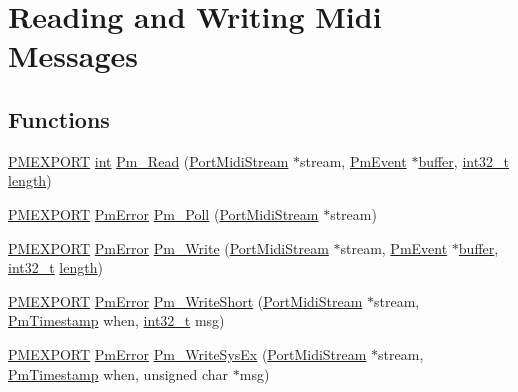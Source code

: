 \hypertarget{group__grp__io}{}\section{Reading and Writing Midi Messages}
\label{group__grp__io}
\subsection*{Functions}
\begin{DoxyCompactItemize}
\item 
\hyperlink{porttime_8h_ad478fb637833fb6b1a4bdb25a03f4662}{P\+M\+E\+X\+P\+O\+RT} \hyperlink{xmltok_8h_a5a0d4a5641ce434f1d23533f2b2e6653}{int} \hyperlink{group__grp__io_ga3d59225bc890ede974f245ada3de6456}{Pm\+\_\+\+Read} (\hyperlink{portmidi_8h_af4949219ee1bb0afc857cb242d123914}{Port\+Midi\+Stream} $\ast$stream, \hyperlink{struct_pm_event}{Pm\+Event} $\ast$\hyperlink{structbuffer}{buffer}, \hyperlink{lib-src_2ffmpeg_2win32_2stdint_8h_a37994e3b11c72957c6f454c6ec96d43d}{int32\+\_\+t} \hyperlink{test__lib_f_l_a_c_2format_8c_ac94dc16b22556ba5fa815655f27442da}{length})
\item 
\hyperlink{porttime_8h_ad478fb637833fb6b1a4bdb25a03f4662}{P\+M\+E\+X\+P\+O\+RT} \hyperlink{portmidi_8h_a5fd46ccd2e320e17a840886731e8c6b9}{Pm\+Error} \hyperlink{group__grp__io_ga54198ca9dc1af9d82ec5f44f661faeea}{Pm\+\_\+\+Poll} (\hyperlink{portmidi_8h_af4949219ee1bb0afc857cb242d123914}{Port\+Midi\+Stream} $\ast$stream)
\item 
\hyperlink{porttime_8h_ad478fb637833fb6b1a4bdb25a03f4662}{P\+M\+E\+X\+P\+O\+RT} \hyperlink{portmidi_8h_a5fd46ccd2e320e17a840886731e8c6b9}{Pm\+Error} \hyperlink{group__grp__io_ga82950117f003d28f9ca6536c00af985a}{Pm\+\_\+\+Write} (\hyperlink{portmidi_8h_af4949219ee1bb0afc857cb242d123914}{Port\+Midi\+Stream} $\ast$stream, \hyperlink{struct_pm_event}{Pm\+Event} $\ast$\hyperlink{structbuffer}{buffer}, \hyperlink{lib-src_2ffmpeg_2win32_2stdint_8h_a37994e3b11c72957c6f454c6ec96d43d}{int32\+\_\+t} \hyperlink{test__lib_f_l_a_c_2format_8c_ac94dc16b22556ba5fa815655f27442da}{length})
\item 
\hyperlink{porttime_8h_ad478fb637833fb6b1a4bdb25a03f4662}{P\+M\+E\+X\+P\+O\+RT} \hyperlink{portmidi_8h_a5fd46ccd2e320e17a840886731e8c6b9}{Pm\+Error} \hyperlink{group__grp__io_ga4a8cdd77e5b2ad4c16338eed475dfc6b}{Pm\+\_\+\+Write\+Short} (\hyperlink{portmidi_8h_af4949219ee1bb0afc857cb242d123914}{Port\+Midi\+Stream} $\ast$stream, \hyperlink{portmidi_8h_acf4245beeef251c4a46d66e99d77ffdf}{Pm\+Timestamp} when, \hyperlink{lib-src_2ffmpeg_2win32_2stdint_8h_a37994e3b11c72957c6f454c6ec96d43d}{int32\+\_\+t} msg)
\item 
\hyperlink{porttime_8h_ad478fb637833fb6b1a4bdb25a03f4662}{P\+M\+E\+X\+P\+O\+RT} \hyperlink{portmidi_8h_a5fd46ccd2e320e17a840886731e8c6b9}{Pm\+Error} \hyperlink{group__grp__io_ga4bd5753bdfb53a1611bcdf5ba159fc87}{Pm\+\_\+\+Write\+Sys\+Ex} (\hyperlink{portmidi_8h_af4949219ee1bb0afc857cb242d123914}{Port\+Midi\+Stream} $\ast$stream, \hyperlink{portmidi_8h_acf4245beeef251c4a46d66e99d77ffdf}{Pm\+Timestamp} when, unsigned char $\ast$msg)
\end{DoxyCompactItemize}


